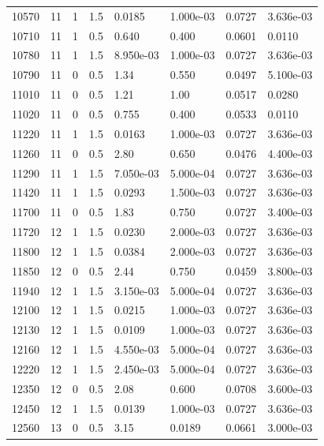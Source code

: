 \documentclass[preview]{standalone}
\begin{document}
{{{{\begin{tabular}{L{1.2cm}C{1.2cm} C{0.3cm}C{0.5cm} C{1.4cm}C{1.4cm} C{1.4cm}C{1.4cm}}
  10570  &    11  & 1     & 1.5 &  0.0185  & 1.000e-03  & 0.0727 &  3.636e-03   \\ 
  10710  &    11  & 1     & 0.5 &  0.640  & 0.400  & 0.0601 &  0.0110   \\ 
  10780  &    11  & 1     & 1.5 &  8.950e-03  & 1.000e-03  & 0.0727 &  3.636e-03   \\ 
  10790  &    11  & 0     & 0.5 &  1.34  & 0.550  & 0.0497 &  5.100e-03   \\ 
  11010  &    11  & 0     & 0.5 &  1.21  & 1.00  & 0.0517 &  0.0280   \\ 
  11020  &    11  & 0     & 0.5 &  0.755  & 0.400  & 0.0533 &  0.0110   \\ 
  11220  &    11  & 1     & 1.5 &  0.0163  & 1.000e-03  & 0.0727 &  3.636e-03   \\ 
  11260  &    11  & 0     & 0.5 &  2.80  & 0.650  & 0.0476 &  4.400e-03   \\ 
  11290  &    11  & 1     & 1.5 &  7.050e-03  & 5.000e-04  & 0.0727 &  3.636e-03   \\ 
  11420  &    11  & 1     & 1.5 &  0.0293  & 1.500e-03  & 0.0727 &  3.636e-03   \\ 
  11700  &    11  & 0     & 0.5 &  1.83  & 0.750  & 0.0727 &  3.400e-03   \\ 
  11720  &    12  & 1     & 1.5 &  0.0230  & 2.000e-03  & 0.0727 &  3.636e-03   \\ 
  11800  &    12  & 1     & 1.5 &  0.0384  & 2.000e-03  & 0.0727 &  3.636e-03   \\ 
  11850  &    12  & 0     & 0.5 &  2.44  & 0.750  & 0.0459 &  3.800e-03   \\ 
  11940  &    12  & 1     & 1.5 &  3.150e-03  & 5.000e-04  & 0.0727 &  3.636e-03   \\ 
  12100  &    12  & 1     & 1.5 &  0.0215  & 1.000e-03  & 0.0727 &  3.636e-03   \\ 
  12130  &    12  & 1     & 1.5 &  0.0109  & 1.000e-03  & 0.0727 &  3.636e-03   \\ 
  12160  &    12  & 1     & 1.5 &  4.550e-03  & 5.000e-04  & 0.0727 &  3.636e-03   \\ 
  12220  &    12  & 1     & 1.5 &  2.450e-03  & 5.000e-04  & 0.0727 &  3.636e-03   \\ 
  12350  &    12  & 0     & 0.5 &  2.08  & 0.600  & 0.0708 &  3.600e-03   \\ 
  12450  &    12  & 1     & 1.5 &  0.0139  & 1.000e-03  & 0.0727 &  3.636e-03   \\ 
  12560  &    13  & 0     & 0.5 &  3.15  & 0.0189  & 0.0661 &  3.000e-03   \\ 

\end{tabular}}}}}
\end{document}

